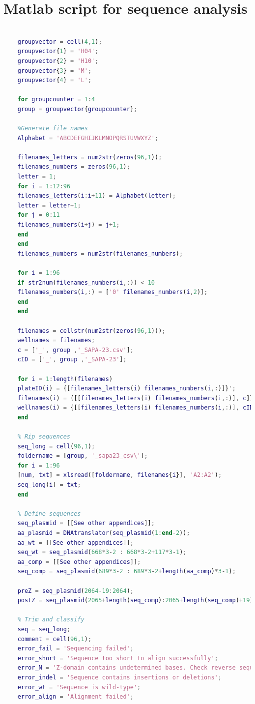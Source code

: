 \documentclass{article}
\begin{document}
	\section{Matlab script for sequence analysis}
	\label{script}
	\begin{lstlisting}[language=Matlab]
	%group = 'L';
	
	groupvector = cell(4,1);
	groupvector{1} = 'H04';
	groupvector{2} = 'H10';
	groupvector{3} = 'M';
	groupvector{4} = 'L';
	
	for groupcounter = 1:4
	group = groupvector{groupcounter};
	
	%Generate file names
	Alphabet = 'ABCDEFGHIJKLMNOPQRSTUVWXYZ';
	
	filenames_letters = num2str(zeros(96,1));
	filenames_numbers = zeros(96,1);
	letter = 1;
	for i = 1:12:96
	filenames_letters(i:i+11) = Alphabet(letter);
	letter = letter+1;
	for j = 0:11
	filenames_numbers(i+j) = j+1;
	end
	end
	filenames_numbers = num2str(filenames_numbers);
	
	for i = 1:96
	if str2num(filenames_numbers(i,:)) < 10
	filenames_numbers(i,:) = ['0' filenames_numbers(i,2)];
	end
	end
	
	filenames = cellstr(num2str(zeros(96,1)));
	wellnames = filenames;
	c = ['_', group ,'_SAPA-23.csv'];
	cID = ['_', group ,'_SAPA-23'];
	
	for i = 1:length(filenames)
	plateID(i) = {[filenames_letters(i) filenames_numbers(i,:)]}';
	filenames(i) = {[[filenames_letters(i) filenames_numbers(i,:)], c]};
	wellnames(i) = {[[filenames_letters(i) filenames_numbers(i,:)], cID]};
	end
	
	% Rip sequences
	seq_long = cell(96,1);
	foldername = [group, '_sapa23_csv\'];
	for i = 1:96
	[num, txt] = xlsread([foldername, filenames{i}], 'A2:A2');
	seq_long(i) = txt;
	end
	
	% Define sequences
	seq_plasmid = [[See other appendices]];
	aa_plasmid = DNAtranslator(seq_plasmid(1:end-2));
	aa_wt = [[See other appendices]];
	seq_wt = seq_plasmid(668*3-2 : 668*3-2+117*3-1);
	aa_comp = [[See other appendices]];
	seq_comp = seq_plasmid(689*3-2 : 689*3-2+length(aa_comp)*3-1);
	
	preZ = seq_plasmid(2064-19:2064);
	postZ = seq_plasmid(2065+length(seq_comp):2065+length(seq_comp)+19);
	
	% Trim and classify
	seq = seq_long;
	comment = cell(96,1);
	error_fail = 'Sequencing failed';
	error_short = 'Sequence too short to align successfully';
	error_N = 'Z-domain contains undetermined bases. Check reverse sequence';
	error_indel = 'Sequence contains insertions or deletions';
	error_wt = 'Sequence is wild-type';
	error_align = 'Alignment failed';
	

\end{lstlisting}
\end{document}
